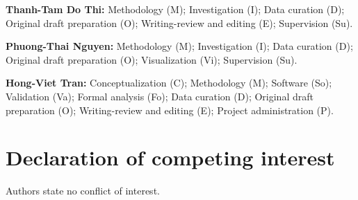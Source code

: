 \documentclass[preprint,12pt]{elsarticle}
\begin{document}
\textbf{Thanh-Tam Do Thi:} Methodology (M); Investigation (I); Data curation (D); Original draft preparation (O); Writing-review and editing (E); Supervision (Su).

\textbf{Phuong-Thai Nguyen:} Methodology (M); Investigation (I); Data curation (D); Original draft preparation (O); Visualization (Vi); Supervision (Su).

\textbf{Hong-Viet Tran:} Conceptualization (C); Methodology (M); Software (So); Validation (Va); Formal analysis (Fo); Data curation (D); Original draft preparation (O); Writing-review and editing (E); Project administration (P).

\section*{Declaration of competing interest}
Authors state no conflict of interest.














\clearpage
\end{document}
